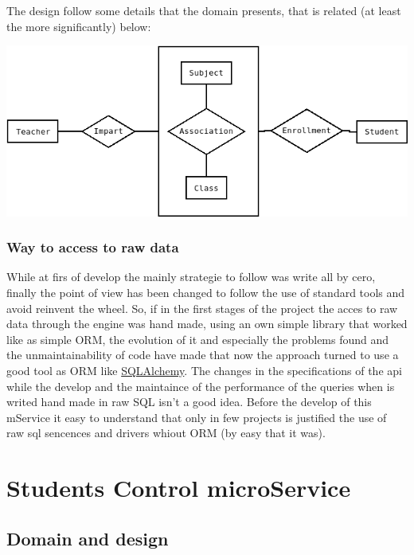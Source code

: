 The design follow some details that the domain presents, that is related
(at least the more significantly) below:

\begin{center}
\includegraphics[scale=0.4]{img/diagrams/dbms-ER.png}
\end{center}



\subsubsection{Way to access to raw data}

While at firs of develop the mainly strategie to follow was write
all by cero, finally the point of view has been changed to follow
the use of standard tools and avoid reinvent the wheel.
\intro
So, if in the first stages of the project the acces to raw data through
the engine was hand made, using an own simple library that worked
like as simple ORM, the evolution of it and especially the problems
found and the unmaintainability of code have made that now the approach
turned to use a good tool as ORM like \href{http://www.google.es}{SQLAlchemy}.
\intro
The changes in the specifications of the api while the develop and
the maintaince of the performance of the queries when is writed hand
made in raw SQL isn't a good idea. Before the develop of this mService
it easy to understand that only in few projects is justified the use
of raw sql sencences and drivers whiout ORM (by easy that it was).


\section{Students Control microService}

\subsection{Domain and design}

